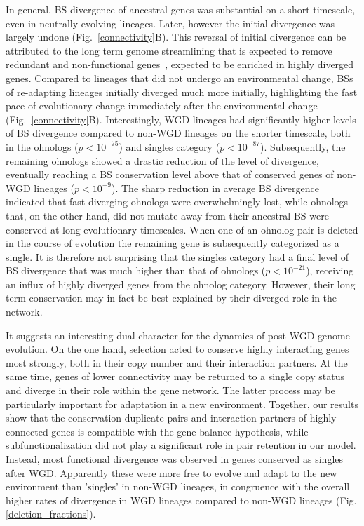 In general, BS divergence of ancestral genes was substantial on a short timescale, even in neutrally evolving lineages. Later, however the initial divergence was largely undone (Fig.~\ref{connectivity}B). This reversal of initial divergence can be attributed to the long term genome streamlining that is expected to remove redundant and non-functional genes~\cite{cuypers_virtual_2012}, expected to be enriched in highly diverged genes. Compared to lineages that did not undergo an environmental change, BSs of re-adapting lineages initially diverged much more initially, highlighting the fast pace of evolutionary change immediately after the environmental change (Fig.~\ref{connectivity}B). Interestingly, WGD lineages had significantly higher levels of BS divergence compared to non-WGD lineages on the shorter timescale, both in the ohnologs ($p<10^{-75}$) and singles category ($p<10^{-87}$). Subsequently, the remaining ohnologs showed a drastic reduction of the level of divergence, eventually reaching a BS conservation level above that of conserved genes of non-WGD lineages ($p<10^{-9}$). The sharp reduction in average BS divergence indicated that fast diverging ohnologs were overwhelmingly lost, while ohnologs that, on the other hand, did not mutate away from their ancestral BS were conserved at long evolutionary timescales. When one of an ohnolog pair is deleted in the course of evolution the remaining gene is subsequently categorized as a single. It is therefore not surprising that the singles category had a final level of BS divergence that was much higher than that of ohnologs ($p<10^{-21}$), receiving an influx of highly diverged genes from the ohnolog category. However, their long term conservation may in fact be best explained by their diverged role in the network. 


It suggests an interesting dual character for the dynamics of post WGD genome evolution. On the one hand, selection acted to conserve highly interacting genes most strongly, both in their copy number and their interaction partners. At the same time, genes of lower connectivity may be returned to a single copy status and diverge in their role within the gene network. The latter process may be particularly important for adaptation in a new environment. Together, our results show that the conservation duplicate pairs and interaction partners of highly connected genes is compatible with the gene balance hypothesis, while subfunctionalization did not play a significant role in pair retention in our model. Instead, most functional divergence was observed in genes conserved as singles after WGD. Apparently these were more free to evolve and adapt to the new environment than 'singles' in non-WGD lineages, in congruence with the overall higher rates of divergence in WGD lineages compared to non-WGD lineages (Fig.\ref{deletion_fractions}). 

